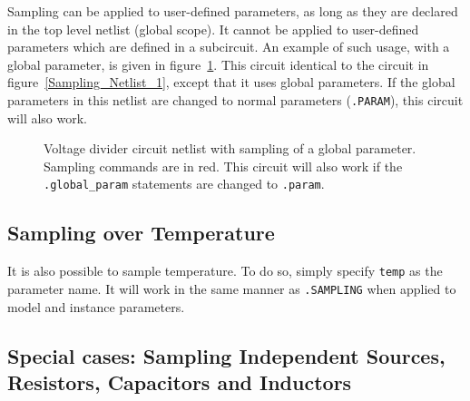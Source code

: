 Sampling can be applied to user-defined parameters, as long as they are declared in the top level netlist (global scope).  
It cannot be applied to user-defined parameters which are defined in a subcircuit.  An example of such usage, with a global parameter, is given 
in figure~\ref{Sampling_Netlist_3}. This circuit identical to the circuit in 
figure~\ref{Sampling_Netlist_1}, except that it uses global parameters.  
If the global parameters in this netlist are changed to normal parameters (\texttt{.PARAM}), this circuit will also work.
\begin{figure}[htbp]
  \fontsize{9pt}{10pt}
\begin{centering}
\caption{Voltage divider circuit netlist with sampling of a global parameter.
  Sampling commands are in \color{XyceRed}red\color{black}.  This circuit will also work if the \texttt{.global\_param} statements are changed to \texttt{.param}.
\label{Sampling_Netlist_3}}
\end{centering}
\end{figure}

\subsection{Sampling over Temperature}
\label{sampling_Temperature}

It is also possible to sample temperature.  To do so, simply 
specify \verb|temp| as the parameter name.  It will work in the 
same manner as \verb|.SAMPLING| when applied to model and instance 
parameters.

\subsection{Special cases: Sampling Independent Sources, Resistors, Capacitors and Inductors}
\label{sampling_SpecialCases}

